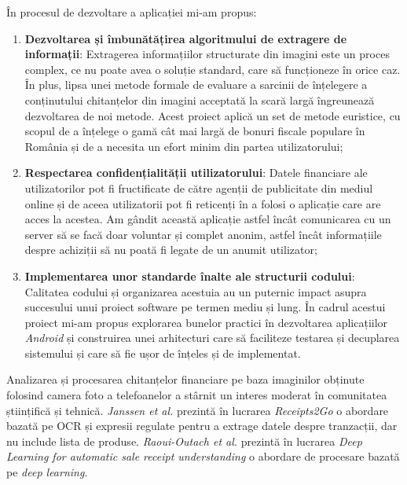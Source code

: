 
În procesul de dezvoltare a aplicației \AppName{} mi-am propus:
\begin{enumerate}
  \item 
  \textbf{Dezvoltarea și îmbunătățirea algoritmului de extragere de informații}: Extragerea informațiilor structurate din imagini este un proces complex, ce nu poate avea o soluție standard, care să funcționeze în orice caz. În plus, lipsa unei metode formale de evaluare a sarcinii de înțelegere a conținutului chitanțelor din imagini acceptată la scară largă îngreunează dezvoltarea de noi metode. Acest proiect aplică un set de metode euristice, cu scopul de a înțelege o gamă cât mai largă de bonuri fiscale populare în România și de a necesita un efort minim din partea utilizatorului;
  \item
  \textbf{Respectarea confidențialității utilizatorului}: Datele financiare ale utilizatorilor pot fi fructificate de către agenții de publicitate din mediul online și de aceea utilizatorii pot fi reticenți în a folosi o aplicație care are acces la acestea. Am gândit această aplicație astfel încât comunicarea cu un server să se facă doar voluntar și complet anonim, astfel încât informațiile despre achiziții să nu poată fi legate de un anumit utilizator;
  \item
  \textbf{Implementarea unor standarde înalte ale structurii codului}: Calitatea codului și organizarea acestuia au un puternic impact asupra succesului unui proiect software pe termen mediu și lung. În cadrul acestui proiect mi-am propus explorarea bunelor practici în dezvoltarea aplicațiilor \emph{Android} și construirea unei arhitecturi care să faciliteze testarea și decuplarea sistemului și care să fie ușor de înțeles și de implementat.
\end{enumerate}


Analizarea și procesarea chitanțelor financiare pe baza imaginilor obținute folosind camera foto a telefoanelor a stârnit un interes moderat în comunitatea științifică și tehnică. \emph{Janssen et al.} prezintă în lucrarea \emph{Receipts2Go} \cite{Receipts2Go} o abordare bazată pe OCR și expresii regulate pentru a extrage datele despre tranzacții, dar nu include lista de produse. \emph{Raoui-Outach et al.} prezintă în lucrarea \emph{Deep Learning for automatic sale receipt understanding} \cite{DL_receipt_understanding} o abordare de procesare bazată pe \emph{deep learning}.

